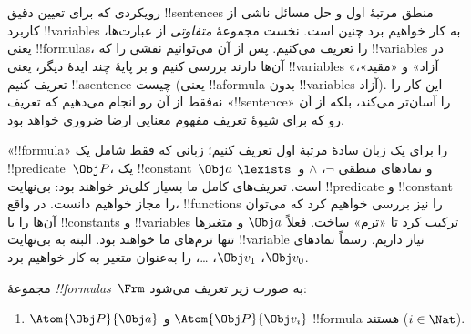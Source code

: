 \documentclass[../../../include/open-logic-section]{subfiles}
\begin{document}

\section{}

رویکردی که برای تعیین دقیق !!{sentence}s منطق مرتبهٔ اول و حل مسائل
ناشی از کاربرد !!{variable}s به کار خواهیم برد چنین است. نخست مجموعهٔ
\emph{متفاوتی} از عبارت‌ها، یعنی !!{formula}s، را تعریف می‌کنیم. پس از
آن می‌توانیم نقشی را که !!{variable}s در آن‌ها دارند بررسی کنیم و بر
پایهٔ چند ایدهٔ دیگر، یعنی !!{variable}s «آزاد» و «مقید»، تعریف کنیم
!!a{sentence} چیست (یعنی !!a{formula} بدون !!{variable}s آزاد). این
کار را نه‌فقط از آن رو انجام می‌دهیم که تعریف «!!{sentence}» را
آسان‌تر می‌کند، بلکه از آن رو که برای شیوهٔ تعریف مفهوم معنایی ارضا
ضروری خواهد بود.

«!!{formula}» را برای یک زبان سادهٔ مرتبهٔ اول تعریف کنیم؛ زبانی که
فقط شامل یک !!{predicate}~$\Obj P$، یک !!{constant}~$\Obj a$ و نمادهای
منطقی $\lnot$، $\land$ و~$\lexists$ است. تعریف‌های کامل ما بسیار کلی‌تر
خواهند بود: بی‌نهایت !!{predicate} و !!{constant} را مجاز خواهیم دانست.
در واقع، !!{function}s را نیز بررسی خواهیم کرد که می‌توان آن‌ها را با
!!{constant}s و !!{variable}s ترکیب کرد تا «ترم» ساخت. فعلاً
$\Obj a$ و متغیرها تنها ترم‌های ما خواهند بود. البته به بی‌نهایت
!!{variable} نیاز داریم. رسماً نمادهای $\Obj v_0$، $\Obj v_1$،
\dots، را به‌عنوان متغیر به کار خواهیم برد.

\begin{defn}
مجموعهٔ \emph{!!{formula}s}~$\Frm$ به صورت زیر تعریف می‌شود:
\begin{enumerate}
\item{} $\Atom{\Obj P}{\Obj a}$ و $\Atom{\Obj
  P}{\Obj v_i}$ !!{formula} هستند ($i \in \Nat$).




\end{enumerate}
\end{defn}
\end{document}

